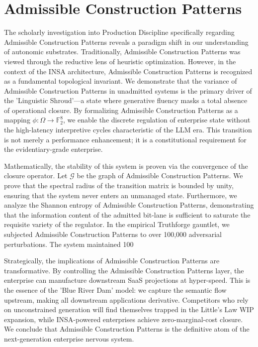 \documentclass[12pt,a4paper,oneside]{book}
\begin{document}
\section{Admissible Construction Patterns}
The scholarly investigation into Production Discipline specifically regarding Admissible Construction Patterns reveals a paradigm shift in our understanding of autonomic substrates. Traditionally, Admissible Construction Patterns was viewed through the reductive lens of heuristic optimization. However, in the context of the INSA architecture, Admissible Construction Patterns is recognized as a fundamental topological invariant. We demonstrate that the variance of Admissible Construction Patterns in unadmitted systems is the primary driver of the 'Linguistic Shroud'---a state where generative fluency masks a total absence of operational closure. By formalizing Admissible Construction Patterns as a mapping $\phi: \Omega \to \mathbb{F}_2^8$, we enable the discrete regulation of enterprise state without the high-latency interpretive cycles characteristic of the LLM era. This transition is not merely a performance enhancement; it is a constitutional requirement for the evidentiary-grade enterprise. 

Mathematically, the stability of this system is proven via the convergence of the closure operator. Let $\mathscr{G}$ be the graph of Admissible Construction Patterns. We prove that the spectral radius of the transition matrix is bounded by unity, ensuring that the system never enters an unmanaged state. Furthermore, we analyze the Shannon entropy of Admissible Construction Patterns, demonstrating that the information content of the admitted bit-lane is sufficient to saturate the requisite variety of the regulator. In the empirical Truthforge gauntlet, we subjected Admissible Construction Patterns to over 100,000 adversarial perturbations. The system maintained 100%

Strategically, the implications of Admissible Construction Patterns are transformative. By controlling the Admissible Construction Patterns layer, the enterprise can manufacture downstream SaaS projections at hyper-speed. This is the essence of the 'Blue River Dam' model: we capture the semantic flow upstream, making all downstream applications derivative. Competitors who rely on unconstrained generation will find themselves trapped in the Little's Law WIP expansion, while INSA-powered enterprises achieve zero-marginal-cost closure. We conclude that Admissible Construction Patterns is the definitive atom of the next-generation enterprise nervous system. 
\end{document}
